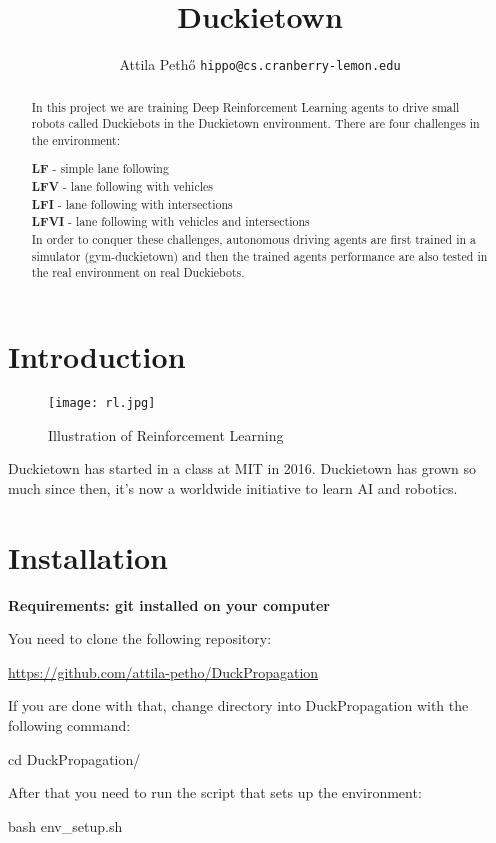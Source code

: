 \documentclass{article}
\title{Duckietown}
\author{
  Attila Pethő
  \texttt{hippo@cs.cranberry-lemon.edu} \\
}
\begin{document}

\maketitle

\begin{abstract}
  In this project we are training Deep Reinforcement Learning agents to drive small robots called Duckiebots in the Duckietown environment. There are four challenges in the environment:

\textbullet  \textbf{LF} - simple lane following\\
\textbullet \textbf{LFV} - lane following with vehicles\\
\textbullet \textbf{LFI} - lane following with intersections\\
\textbullet \textbf{LFVI} - lane following with vehicles and intersections\\
In order to conquer these challenges, autonomous driving agents are first trained in a simulator (gym-duckietown) and then the trained agents performance are also tested in the real environment on real Duckiebots.
\end{abstract}

\section{\large{Introduction}}
\begin{figure}[h!]
	\centering
	\texttt{[image: rl.jpg]}
	\caption{Illustration of Reinforcement Learning}
\end{figure}
Duckietown has started in a class at MIT in 2016. Duckietown has grown so much since then, it's now a worldwide initiative to learn AI and robotics.

\section{\large{Installation}}

\textbf{Requirements: git installed on your computer}

You need to clone the following repository:\\
\begin{center}
  \url{https://github.com/attila-petho/DuckPropagation}
\end{center}

If you are done with that, change directory into DuckPropagation with the following command:
\begin{center}
	cd DuckPropagation/
\end{center}
After that you need to run the script that sets up the environment:
\begin{center}
	bash env\_setup.sh
\end{center}
\end{document}
